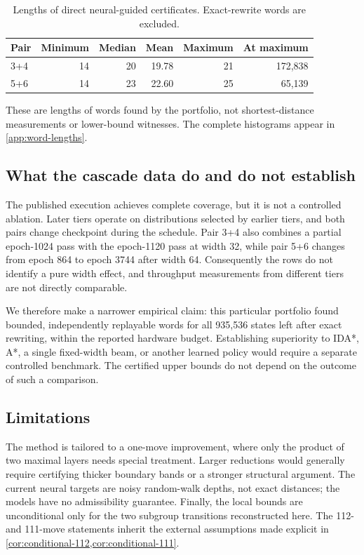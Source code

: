 \begin{table}[t]
\centering
\caption{Lengths of direct neural-guided certificates.  Exact-rewrite words
are excluded.}
\label{tab:direct-word-lengths}
\small
\begin{tabular}{@{}lrrrrr@{}}
\toprule
Pair & Minimum & Median & Mean & Maximum & At maximum\\
\midrule
3+4 & 14 & 20 & 19.78 & 21 & 172,838\\
5+6 & 14 & 23 & 22.60 & 25 & 65,139\\
\bottomrule
\end{tabular}
\end{table}
These are lengths of words found by the portfolio, not shortest-distance
measurements or lower-bound witnesses.  The complete histograms appear in
\cref{app:word-lengths}.

\subsection{What the cascade data do and do not establish}

The published execution achieves complete coverage, but it is not a controlled
ablation.  Later tiers operate on distributions selected by earlier tiers, and
both pairs change checkpoint during the schedule.  Pair 3+4 also combines a
partial epoch-1024 pass with the epoch-1120 pass at width 32, while pair 5+6
changes from epoch 864 to epoch 3744 after width 64.  Consequently the rows do
not identify a pure width effect, and throughput measurements from different
tiers are not directly comparable.

We therefore make a narrower empirical claim: this particular portfolio found
bounded, independently replayable words for all 935,536 states left after exact
rewriting, within the reported hardware budget.  Establishing superiority to
IDA*, A*, a single fixed-width beam, or another learned policy would require a
separate controlled benchmark.  The certified upper bounds do not depend on
the outcome of such a comparison.

\subsection{Limitations}

The method is tailored to a one-move improvement, where only the product of
two maximal layers needs special treatment.  Larger reductions would generally
require certifying thicker boundary bands or a stronger structural argument.
The current neural targets are noisy random-walk depths, not exact distances;
the models have no admissibility guarantee.  Finally, the local bounds are
unconditional only for the two subgroup transitions reconstructed here.  The
112- and 111-move statements inherit the external assumptions made explicit in
\cref{cor:conditional-112,cor:conditional-111}.
